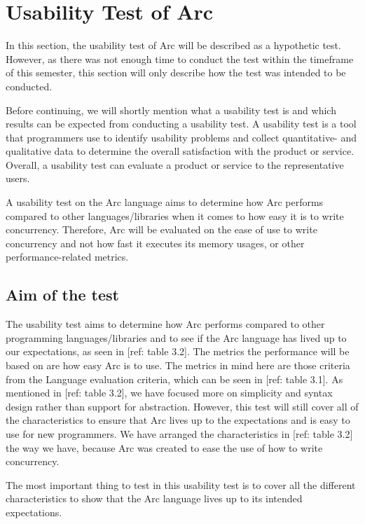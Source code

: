 \section{Usability Test of Arc}\label{subsec:usabilityTestOfArc}
In this section, the usability test of Arc will be described as a hypothetic test. However, as there was not enough time to conduct the test within the timeframe of this semester, this section will only describe how the test was intended to be conducted.

Before continuing, we will shortly mention what a usability test is and which results can be expected from conducting a usability test. A usability test is a tool that programmers use to identify usability problems and collect quantitative- and qualitative data to determine the overall satisfaction with the product or service. Overall, a usability test can evaluate a product or service to the representative users.

A usability test on the Arc language aims to determine how Arc performs compared to other languages/libraries when it comes to how easy it is to write concurrency. Therefore, Arc will be evaluated on the ease of use to write concurrency and not how fast it executes its memory usages, or other performance-related metrics.


\subsection{Aim of the test}\label{subsubsec:aimOfTheTest}
The usability test aims to determine how Arc performs compared to other programming languages/libraries and to see if the Arc language has lived up to our expectations, as seen in [ref: table 3.2]. The metrics the performance will be based on are how easy Arc is to use. The metrics in mind here are those criteria from the Language evaluation criteria, which can be seen in [ref: table 3.1]. As mentioned in [ref: table 3.2], we have focused more on simplicity and syntax design rather than support for abstraction. However, this test will still cover all of the characteristics to ensure that Arc lives up to the expectations and is easy to use for new programmers. We have arranged the characteristics in [ref: table 3.2] the way we have, because Arc was created to ease the use of how to write concurrency.

The most important thing to test in this usability test is to cover all the different characteristics to show that the Arc language lives up to its intended expectations.

